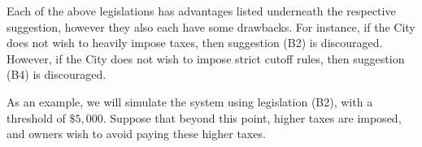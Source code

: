 \documentclass{article}
\begin{document}
Each of the above legislations has advantages listed underneath the respective suggestion, however
they also each have some drawbacks. For instance, if the City does not wish to heavily impose taxes,
then suggestion (B2) is discouraged. However, if the City does not wish to impose strict cutoff
rules, then suggestion (B4) is discouraged.

As an example, we will simulate the system using legislation (B2), with a threshold of $ \$5,000 $.
Suppose that beyond this point, higher taxes are imposed, and owners wish to avoid paying these
higher taxes.
\end{document}

